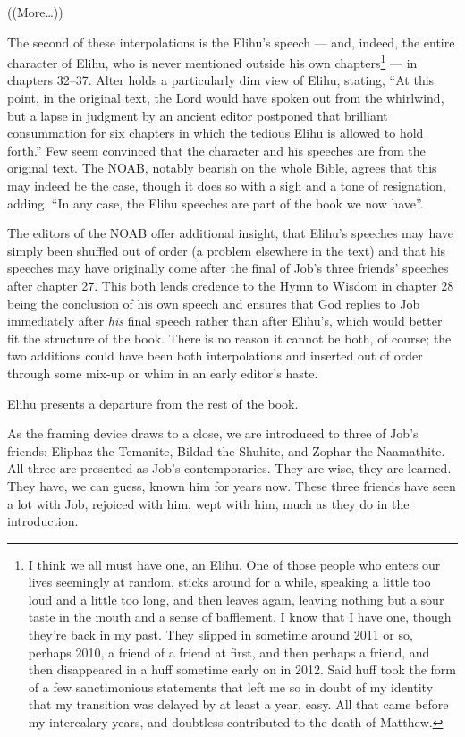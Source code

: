 ((More\ldots))

The second of these interpolations is the Elihu's speech --- and, indeed, the entire character of Elihu, who is never mentioned outside his own chapters\footnote{I think we all must have one, an Elihu. One of those people who enters our lives seemingly at random, sticks around for a while, speaking a little too loud and a little too long, and then leaves again, leaving nothing but a sour taste in the mouth and a sense of bafflement. I know that I have one, though they're back in my past. They slipped in sometime around 2011 or so, perhaps 2010, a friend of a friend at first, and then perhaps a friend, and then disappeared in a huff sometime early on in 2012. Said huff took the form of a few sanctimonious statements that left me so in doubt of my identity that my transition was delayed by at least a year, easy. All that came before my intercalary years, and doubtless contributed to the death of Matthew.} --- in chapters 32--37. Alter holds a particularly dim view of Elihu, stating, ``At this point, in the original text, the Lord would have spoken out from the whirlwind, but a lapse in judgment by an ancient editor postponed that brilliant consummation for six chapters in which the tedious Elihu is allowed to hold forth.'' \parencite[460]{alter} Few seem convinced that the character and his speeches are from the original text. The NOAB, notably bearish on the whole Bible, agrees that this may indeed be the case, though it does so with a sigh and a tone of resignation, adding, ``In any case, the Elihu speeches are part of the book we now have''. \parencite[767]{noab}

The editors of the NOAB offer additional insight, that Elihu's speeches may have simply been shuffled out of order (a problem elsewhere in the text) and that his speeches may have originally come after the final of Job's three friends' speeches after chapter 27. This both lends credence to the Hymn to Wisdom in chapter 28 being the conclusion of his own speech and ensures that God replies to Job immediately after \emph{his} final speech rather than after Elihu's, which would better fit the structure of the book. There is no reason it cannot be both, of course; the two additions could have been both interpolations and inserted out of order through some mix-up or whim in an early editor's haste.

Elihu presents a departure from the rest of the book.

As the framing device draws to a close, we are introduced to three of Job's friends: Eliphaz the Temanite, Bildad the Shuhite, and Zophar the Naamathite. All three are presented as Job's contemporaries. They are wise, they are learned. They have, we can guess, known him for years now. These three friends have seen a lot with Job, rejoiced with him, wept with him, much as they do in the introduction.

